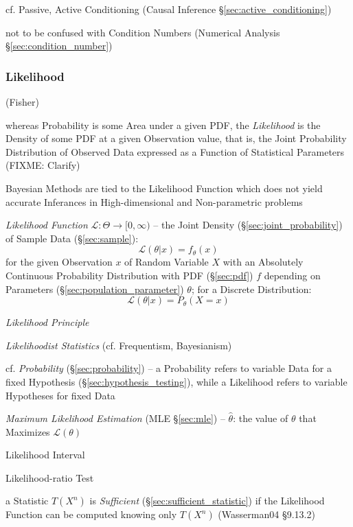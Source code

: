 \fist cf. Passive, Active Conditioning (Causal Inference
\S\ref{sec:active_conditioning})

\fist not to be confused with Condition Numbers (Numerical Analysis
\S\ref{sec:condition_number})



\subsubsection{Likelihood}\label{sec:likelihood}

(Fisher)

whereas Probability is some Area under a given PDF, the \emph{Likelihood} is the
Density of some PDF at a given Observation value, that is, the Joint Probability
Distribution of Observed Data expressed as a Function of Statistical Parameters
(FIXME: Clarify)

\fist Bayesian Methods are tied to the Likelihood Function which does not yield
accurate Inferances in High-dimensional and Non-parametric problems

\emph{Likelihood Function} $\mathcal{L} : \Theta \rightarrow [0, \infty)$ -- the
  Joint Density (\S\ref{sec:joint_probability}) of Sample Data
  (\S\ref{sec:sample}):
\[
  \mathcal{L}(\theta | x) = f_\theta(x)
\]
for the given Observation $x$ of Random Variable $X$ with an Absolutely
Continuous Probability Distribution with PDF (\S\ref{sec:pdf}) $f$ depending on
Parameters (\S\ref{sec:population_parameter}) $\theta$; for a Discrete
Distribution:
\[
  \mathcal{L}(\theta | x) = P_\theta(X = x)
\]

\emph{Likelihood Principle}

\emph{Likelihoodist Statistics} (cf. Frequentism, Bayesianism)

cf. \emph{Probability} (\S\ref{sec:probability}) -- a Probability refers to
variable Data for a fixed Hypothesis (\S\ref{sec:hypothesis_testing}), while a
Likelihood refers to variable Hypotheses for fixed Data

\emph{Maximum Likelihood Estimation} (MLE \S\ref{sec:mle}) -- $\hat{\theta}$:
the value of $\theta$ that Maximizes $\mathcal{L}(\theta)$

Likelihood Interval

Likelihood-ratio Test

\fist a Statistic $T(X^n)$ is \emph{Sufficient}
(\S\ref{sec:sufficient_statistic}) if the Likelihood Function can be computed
knowing only $T(X^n)$ (Wasserman04 \S9.13.2)



